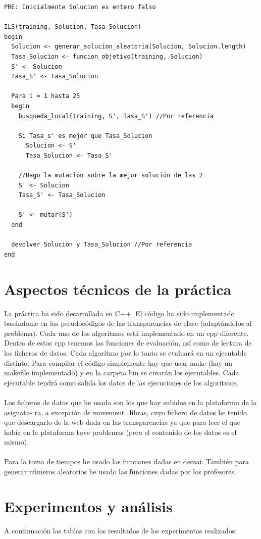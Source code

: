 \begin{lstlisting}
PRE: Inicialmente Solucion es entero falso

ILS(training, Solucion, Tasa_Solucion)
begin
  Solucion <- generar_solucion_aleatoria(Solucion, Solucion.length)
  Tasa_Solucion <- funcion_objetivo(training, Solucion)
  S' <- Solucion
  Tasa_S' <- Tasa_Solucion
  
  Para i = 1 hasta 25
  begin
    busqueda_local(training, S', Tasa_S') //Por referencia
    
    Si Tasa_s' es mejor que Tasa_Solucion
      Solucion <- S'
      Tasa_Solucion <- Tasa_S'
    
    //Hago la mutación sobre la mejor solución de las 2
    S' <- Solucion
    Tasa_S' <- Tasa_Solucion
    
    S' <- mutar(S')
  end
  
  devolver Solucion y Tasa_Solucion //Por referencia
end
\end{lstlisting}

\section{Aspectos técnicos de la práctica}
La práctica ha sido desarrollada en C++. El código ha sido implementado basándome en los
pseudocódigos de las transparencias de clase (adaptándolos al problema). Cada uno de los algoritmos está implementado en un cpp diferente. Dentro de estos cpp tenemos las funciones de
evaluación, así como de lectura de los ficheros de datos. Cada algoritmo por lo tanto se evaluará
en un ejecutable distinto. Para compilar el código simplemente hay que usar make (hay un makefile implementado) y en la carpeta bin se crearán los ejecutables. Cada ejecutable tendrá como
salida los datos de las ejecuciones de los algoritmos.
\\
\\
Los ficheros de datos que he usado son los que hay subidos en la plataforma de la asignatu-
ra, a excepción de movement\_libras, cuyo fichero de datos he tenido que descargarlo de la web
dada en las transparencias ya que para leer el que había en la plataforma tuve problemas (pero
el contenido de los datos es el mismo).
\\
\\
Para la toma de tiempos he usado las funciones dadas en decsai. También para generar números
aleatorios he usado las funciones dadas por los profesores.


\section{Experimentos y análisis}
A continuación las tablas con los resultados de los experimentos realizados:

